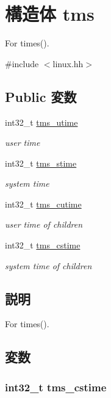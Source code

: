 \hypertarget{structArmLinux32_1_1tms}{
\section{構造体 tms}
\label{structArmLinux32_1_1tms}
}


For times().  


{\ttfamily \#include $<$linux.hh$>$}\subsection*{Public 変数}
\begin{DoxyCompactItemize}
\item 
int32\_\-t \hyperlink{structArmLinux32_1_1tms_ab653476c9f49aba7c1c0a2b3bf0ea5bf}{tms\_\-utime}
\begin{DoxyCompactList}\small\item\em user time \item\end{DoxyCompactList}\item 
int32\_\-t \hyperlink{structArmLinux32_1_1tms_a8538f2f33ab27e739791168aae55f252}{tms\_\-stime}
\begin{DoxyCompactList}\small\item\em system time \item\end{DoxyCompactList}\item 
int32\_\-t \hyperlink{structArmLinux32_1_1tms_a1a6cb5b8afe4daa7206ed2483504f546}{tms\_\-cutime}
\begin{DoxyCompactList}\small\item\em user time of children \item\end{DoxyCompactList}\item 
int32\_\-t \hyperlink{structArmLinux32_1_1tms_a466a5cdb950adbb4cde0a598402d5717}{tms\_\-cstime}
\begin{DoxyCompactList}\small\item\em system time of children \item\end{DoxyCompactList}\end{DoxyCompactItemize}


\subsection{説明}
For times(). 

\subsection{変数}
\hypertarget{structArmLinux32_1_1tms_a466a5cdb950adbb4cde0a598402d5717}{
\subsubsection[{tms\_\-cstime}]{\setlength{\rightskip}{0pt plus 5cm}int32\_\-t {\bf tms\_\-cstime}}}
\label{structArmLinux32_1_1tms_a466a5cdb950adbb4cde0a598402d5717}


